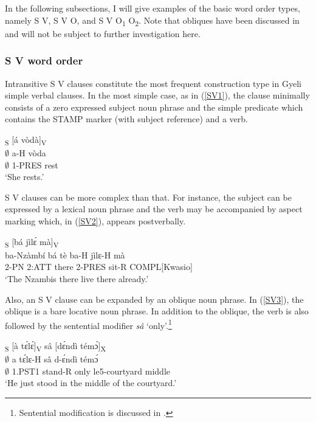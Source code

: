 In the following subsections, I will give examples of the basic word order types, namely S V, S V O, and S V O\textsubscript{1} O\textsubscript{2}. Note that obliques have been discussed in  and will not be subject to further investigation here.

\subsubsection{S V word order}
\label{sec:SV}

Intransitive S V clauses constitute the most frequent construction type in Gyeli simple verbal clauses.
In the most simple case, as in (\ref{SV1}), the clause minimally consists of a zero expressed subject noun phrase and the simple predicate which contains the STAMP marker (with subject reference) and a verb.

\begin{exe}
\ex\label{SV1}
  \glll [$\emptyset$]\textsubscript{S} [á vòdà]\textsubscript{V} \\
	$\emptyset$ a-H vòda \\
        $\emptyset$  1-PRES rest   \\
    \trans `She rests.'
\end{exe}

S V clauses can be more complex than that. For instance, the subject can be expressed by a lexical noun phrase and the verb may be accompanied by aspect marking which, in (\ref{SV2}), appears postverbally.

\begin{exe} 
\ex\label{SV2}
  \textsubscript{S} [bá jìlɛ́ mà]\textsubscript{V} \\
          ba-Nzàmbí bá tè ba-H jìlɛ-H mà \\
              2-PN 2:ATT there 2-PRES sit-R COMPL[Kwasio]   \\
    \trans `The Nzambis there live there already.'
\end{exe}

Also, an S V clause can be expanded by an oblique noun phrase. In (\ref{SV3}), the oblique is a bare locative noun phrase. In addition to the oblique, the verb is also followed by the sentential modifier {\itshape sâ} `only'.\footnote{Sentential modification is discussed in .}

\begin{exe} 
\ex\label{SV3} 
  \glll [$\emptyset$]\textsubscript{S}  [à tɛ́lɛ́]\textsubscript{V} sâ [dɛ́ndì témɔ́]\textsubscript{X} \\
       $\emptyset$  a tɛ́lɛ-H sâ d-ɛ́ndì témɔ́ \\
       $\emptyset$  1.PST1 stand-R only le5-courtyard middle \\
    \trans `He just stood in the middle of the courtyard.'
\end{exe}

